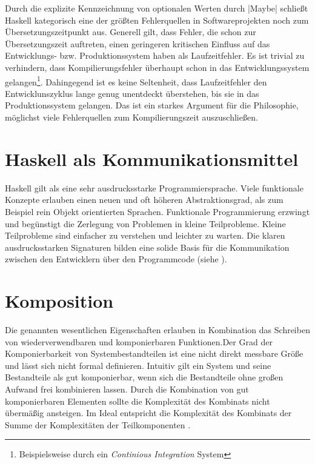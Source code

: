 Durch die explizite Kennzeichnung von optionalen Werten durch |Maybe| schließt Haskell kategorisch eine der größten Fehlerquellen in Softwareprojekten noch zum Übersetzungszeitpunkt aus. Generell gilt, dass Fehler, die schon zur Übersetzungszeit auftreten, einen geringeren kritischen Einfluss auf das Entwicklungs- bzw. Produktionssystem haben als Laufzeitfehler. Es ist trivial zu verhindern, dass Kompilierungsfehler überhaupt schon in das Entwicklungssystem gelangen\footnote{Beispielsweise durch ein \textit{Continious Integration} System}. Dahingegend ist es keine Seltenheit, dass Laufzeitfehler den Entwicklunszyklus lange genug unentdeckt überstehen, bis sie in das Produktionssystem gelangen. Das ist ein starkes Argument für die Philosophie, möglichst viele Fehlerquellen zum Kompilierungszeit auszuschließen.

\section{Haskell als Kommunikationsmittel}

Haskell gilt als eine sehr ausdrucksstarke Programmiersprache. Viele funktionale Konzepte erlauben einen neuen und oft höheren Abstraktionsgrad, als zum Beispiel rein Objekt orientierten Sprachen. Funktionale Programmierung erzwingt und begünstigt die Zerlegung von Problemen in kleine Teilprobleme. Kleine Teilprobleme sind einfacher zu verstehen und leichter zu warten. Die klaren ausdrucksstarken Signaturen bilden eine solide Basis für die Kommunikation zwischen den Entwicklern über den Programmcode (siehe ).

\section{Komposition}

Die genannten wesentlichen Eigenschaften erlauben in Kombination das Schreiben von wiederverwendbaren und komponierbaren Funktionen.Der Grad der Komponierbarkeit von Systembestandteilen ist eine nicht direkt messbare Größe und lässt sich nicht formal definieren. Intuitiv gilt ein System und seine Bestandteile als gut komponierbar, wenn sich die Bestandteile ohne großen Aufwand frei kombinieren lassen. Durch die Kombination von gut komponierbaren Elementen sollte die Komplexität des Kombinats nicht übermäßig ansteigen. Im Ideal entspricht die Komplexität des Kombinats der Summe der Komplexitäten der Teilkomponenten \parencite[Seite 19]{Blackheath2013}.


